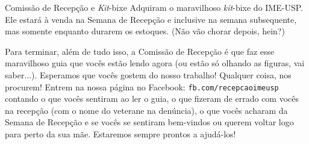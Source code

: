 \begin{secao}{Comissão de Recepção e \textit{Kit}-bixe}
Adquiram o maravilhoso \textit{kit}-bixe do IME-USP. Ele estará à venda na Semana de Recepção
e inclusive na semana subsequente, mas somente enquanto durarem os estoques. (Não vão chorar
depois, hein?)

Para terminar, além de tudo isso, a Comissão de Recepção é que faz esse maravilhoso guia que
vocês estão lendo agora (ou estão só olhando as figuras, vai
saber...). Esperamos que vocês gostem do nosso trabalho! Qualquer coisa, nos
procurem! Entrem na nossa página no Facebook: {\tt fb.com/recepcaoimeusp} contando
o que vocês sentiram ao ler o guia, o que fizeram de errado com vocês na
recepção (com o nome do veterane na denúncia), o que vocês acharam da Semana
de Recepção e se vocês se sentiram bem-vindos ou querem voltar logo para perto
da sua mãe. Estaremos sempre prontos a ajudá-los!
\end{secao}
